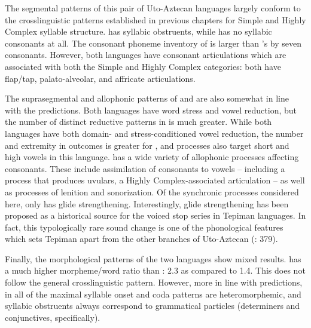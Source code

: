   The segmental patterns of this pair of Uto-Aztecan languages largely conform to the crosslinguistic patterns established in previous chapters for Simple and Highly Complex syllable structure.  has syllabic obstruents, while  has no syllabic consonants at all. The consonant phoneme inventory of  is larger than ’s by seven consonants. However, both languages have consonant articulations which are associated with both the Simple and Highly Complex categories: both have flap/tap, palato-alveolar, and affricate articulations.

  The suprasegmental and allophonic patterns of  and  are also somewhat in line with the predictions. Both languages have word stress and vowel reduction, but the number of distinct reductive patterns in  is much greater. While both languages have both domain- and stress-conditioned vowel reduction, the number and extremity in outcomes is greater for , and processes also target short and high vowels in this language.  has a wide variety of allophonic processes affecting consonants. These include assimilation of consonants to vowels -- including a process that produces uvulars, a Highly Complex-associated articulation -- as well as processes of lenition and sonorization. Of the synchronic processes considered here,  only has glide strengthening. Interestingly, glide strengthening has been proposed as a historical source for the voiced stop series in Tepiman languages. In fact, this typologically rare sound change is one of the phonological features which sets Tepiman apart from the other branches of Uto-Aztecan (\citealt{ShaulHill1998}: 379).

  Finally, the morphological patterns of the two languages show mixed results.  has a much higher morpheme/word ratio than : 2.3 as compared to 1.4. This does not follow the general crosslinguistic pattern. However, more in line with predictions, in  all of the maximal syllable onset and coda patterns are heteromorphemic, and syllabic obstruents always correspond to grammatical particles (determiners and conjunctives, specifically).

